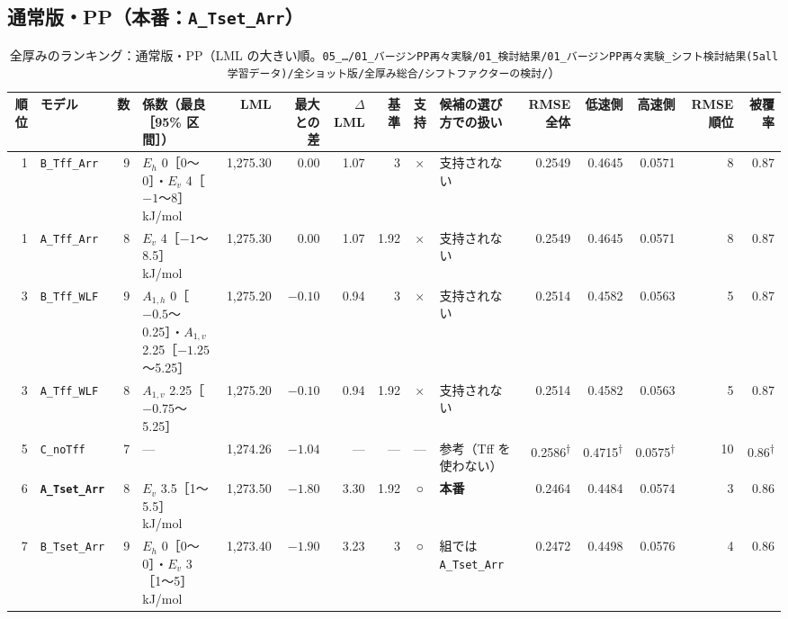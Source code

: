 \documentclass[paper=a4paper,landscape,fontsize=10pt,line_length=62zw,number_of_lines=34]{jlreq}
\let\origtextbf\textbf
\renewcommand{\textbf}[1]{\origtextbf{\gtfamily #1}}   %
\begin{document}
\subsection{通常版・PP（本番：\texttt{A\_\allowbreak{}Tset\_\allowbreak{}Arr}）}
\begin{table}[H]\centering\footnotesize
\caption{全厚みのランキング：通常版・PP（LML の大きい順。\texttt{05\_\allowbreak{}…/\allowbreak{}01\_\allowbreak{}バージンPP再々実験/\allowbreak{}01\_\allowbreak{}検討結果/\allowbreak{}01\_\allowbreak{}バージンPP再々実験\_\allowbreak{}シフト検討結果(5all学習データ)/\allowbreak{}全ショット版/\allowbreak{}全厚み総合/\allowbreak{}シフトファクターの検討/\allowbreak{}}）}
\begin{tabular}{rlrp{12\zw}rrrrcp{8.5\zw}rrrrr}
\toprule
順位 & モデル & 数 & 係数（最良［95\% 区間］） & LML & 最大との差 & $\Delta$LML & 基準 & 支持 & 候補の選び方での扱い & RMSE 全体 & 低速側 & 高速側 & RMSE 順位 & 被覆率 \\
\midrule
1 & \texttt{B\_\allowbreak{}Tff\_\allowbreak{}Arr} & 9 & $E_h$ 0［0〜0］・$E_v$ 4［$-1$〜8］ kJ/mol & 1,275.30 & 0.00 & 1.07 & 3 & × & 支持されない & 0.2549 & 0.4645 & 0.0571 & 8 & 0.87 \\
1 & \texttt{A\_\allowbreak{}Tff\_\allowbreak{}Arr} & 8 & $E_v$ 4［$-1$〜8.5］ kJ/mol & 1,275.30 & 0.00 & 1.07 & 1.92 & × & 支持されない & 0.2549 & 0.4645 & 0.0571 & 8 & 0.87 \\
3 & \texttt{B\_\allowbreak{}Tff\_\allowbreak{}WLF} & 9 & $A_{1,h}$ 0［$-0.5$〜0.25］・$A_{1,v}$ 2.25［$-1.25$〜5.25］ & 1,275.20 & $-0.10$ & 0.94 & 3 & × & 支持されない & 0.2514 & 0.4582 & 0.0563 & 5 & 0.87 \\
3 & \texttt{A\_\allowbreak{}Tff\_\allowbreak{}WLF} & 8 & $A_{1,v}$ 2.25［$-0.75$〜5.25］ & 1,275.20 & $-0.10$ & 0.94 & 1.92 & × & 支持されない & 0.2514 & 0.4582 & 0.0563 & 5 & 0.87 \\
5 & \texttt{C\_\allowbreak{}noTff} & 7 & --- & 1,274.26 & $-1.04$ & --- & --- & --- & 参考（Tff を使わない） & 0.2586\textsuperscript{†} & 0.4715\textsuperscript{†} & 0.0575\textsuperscript{†} & 10 & 0.86\textsuperscript{†} \\
6 & \textbf{\texttt{A\_\allowbreak{}Tset\_\allowbreak{}Arr}} & 8 & $E_v$ 3.5［1〜5.5］ kJ/mol & 1,273.50 & $-1.80$ & 3.30 & 1.92 & ○ & \textbf{本番} & 0.2464 & 0.4484 & 0.0574 & 3 & 0.86 \\
7 & \texttt{B\_\allowbreak{}Tset\_\allowbreak{}Arr} & 9 & $E_h$ 0［0〜0］・$E_v$ 3［1〜5］ kJ/mol & 1,273.40 & $-1.90$ & 3.23 & 3 & ○ & 組では \texttt{A\_\allowbreak{}Tset\_\allowbreak{}Arr} & 0.2472 & 0.4498 & 0.0576 & 4 & 0.86 \\

\end{tabular}
\end{table}
\end{document}
